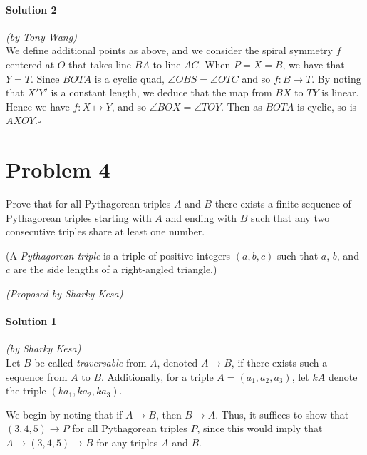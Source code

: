 \documentclass[10pt]{article}
\begin{document}
		\noindent \makebox[\linewidth]{\rule{\textwidth}{0.4pt}}
	
	\paragraph{Solution 2} \textit{(by Tony Wang)}\\
	
	\noindent We define additional points as above, and we consider the spiral symmetry \(f\) centered at \(O\) that takes line \(BA\) to line \(AC\). When \(P = X = B\), we have that \(Y = T\). Since \(BOTA\) is a cyclic quad, \(\angle OBS = \angle OTC\) and so \(f: B \mapsto T\). By noting that \(X'Y'\) is a constant length, we deduce that the map from \(BX\) to \(TY\) is linear. Hence we have \(f : X \mapsto Y\), and so \(\angle BOX = \angle TOY\). Then as \(BOTA\) is cyclic, so is \(AXOY\).\space \hfill\ensuremath{\square}
	
	\newpage
	
	\section*{Problem 4}
	
	Prove that for all Pythagorean triples \(A\) and \(B\) there exists a finite sequence of Pythagorean triples starting with \(A\) and ending with \(B\) such that any two consecutive triples share at least one number.
	
	(A \emph{Pythagorean triple} is a triple of positive integers \((a, b, c)\) such that \(a\), \(b\), and \(c\) are the side lengths of a right-angled triangle.)
	\begin{flushright}
	\textit{(Proposed by Sharky Kesa)}
	\end{flushright}
	
		\noindent \makebox[\linewidth]{\rule{\textwidth}{0.4pt}}
	
	\paragraph{Solution 1} \textit{(by Sharky Kesa)}\\
	
	\noindent Let \(B\) be called \emph{traversable} from \(A\), denoted \(A \to B\), if there exists such a sequence from \(A\) to \(B\). Additionally, for a triple $A=(a_1, a_2, a_3)$, let \(kA\) denote the triple \((ka_1, ka_2, ka_3)\).
	
	We begin by noting that if \(A \to B\), then \(B \to A\). Thus, it suffices to show that $(3, 4, 5) \to P$ for all Pythagorean triples \(P\), since this would imply that \(A \to (3,4,5) \to B\) for any triples \(A\) and \(B\).
	
\end{document}
